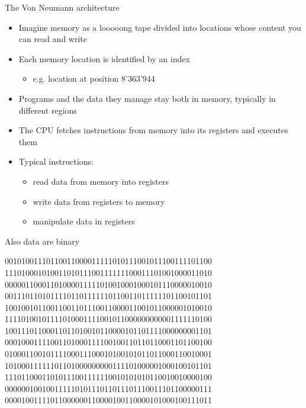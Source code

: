 \begin{frame}{The Von Neumann architecture \insertcontinuationtext}

  \begin{itemize}[<+->]
  \item Imagine memory as a looooong tape divided into locations whose content
    you can read and write
  \item Each memory location is identified by an index
    \begin{itemize}[<.->]
    \item e.g. location at position 8'363'944
    \end{itemize}
  \item Programs and the data they manage stay both in memory, typically in
    different regions
  \item The CPU fetches instructions from memory into its registers and executes
    them
  \item Typical instructions:
    \begin{itemize}[<.->]
    \item read data from memory into registers
    \item write data from registers to memory
    \item manipulate data in registers
    \end{itemize}
  \end{itemize}
\end{frame}

\begin{frame}[fragile]{Also data are binary}

  \begin{semiverbatim}
{\color{gray}00101001110110011000011111010111001011100111101100
11101000101001101011100111111100011101001000011010
00000110001101000011111010010001000101110000010010
00111011010111101101111110110011011111101100101101
10010010110011001101110011000011001011000001010010
11110100101111010001111001011000000000001111110100
10011101100011011010010110000101101111000000001101
00010001111001101000111100100110110110001101100100
01000110010111100011100010100101011011000110010001
10100011111101101000000000111101000001000100101101
11101100011010111001111110010101010110010010000100
00000010010011111010111011011101110011101100000111
00001001111011000000110000100110000101000100111011}\end{semiverbatim}


\end{frame}

